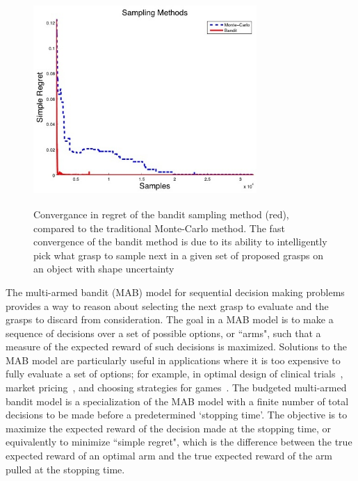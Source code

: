\documentclass[journal,transmag]{IEEEtran}%
\begin{document}
\begin{figure}[t!]
\centering
\includegraphics[width=8.5cm,height=8cm]{figures/Slide02.jpg}
\caption{\footnotesize
Convergance in regret of the bandit sampling method (red), compared to the traditional Monte-Carlo method. The fast convergence of the bandit method is due to its ability to intelligently pick what grasp to sample next in a given set of proposed grasps on an object with shape uncertainty}
\vspace*{-10pt}
\label{fig:noisy data}
\end{figure}

The multi-armed bandit (MAB) model for sequential decision making problems \cite{barto1998reinforcement, lai1985asymptotically, robbins1952some} provides a way to reason about selecting the next grasp to evaluate and the grasps to discard from consideration.
The goal in a MAB model is to make a sequence of decisions over a set of possible options, or ``arms", such that a measure of the expected reward of such decisions is maximized.
Solutions to the MAB model are particularly useful in applications where it is too expensive to fully evaluate a set of options; for example, in optimal design of clinical trials~\cite{simon1989optimal}, market pricing~\cite{rothschild1974two}, and choosing strategies for games~\cite{st2012online}.
The budgeted multi-armed bandit model \cite{madani2004budgeted} is a specialization of the MAB model with a finite number of total decisions to be made before a predetermined `stopping time'.
The objective is to maximize the expected reward of the decision made at the stopping time, or equivalently to minimize ``simple regret", which is the difference between the true expected reward of an optimal arm and the true expected reward of the arm pulled at the stopping time.
\end{document}
